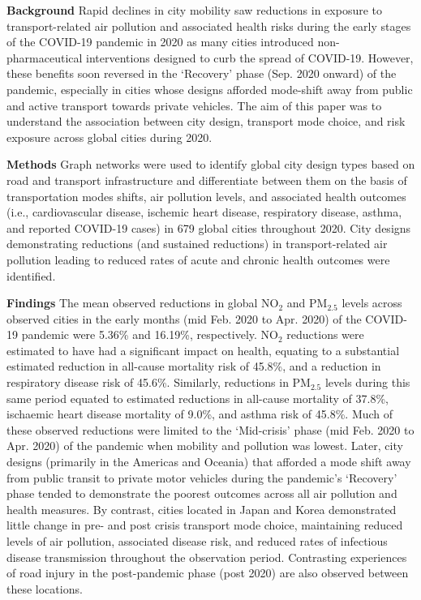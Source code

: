 \documentclass[preprint,10pt]{elsarticle} %
\newcommand{\absdiv}[1]{%
  \par\addvspace{.5\baselineskip}%
  \noindent\textbf{#1}\quad\ignorespaces}
\begin{document}


 \absdiv{\textcolor{OliveGreen}{Background}}
Rapid declines in city mobility saw reductions in exposure to transport-related air pollution and associated health risks during the early stages of the COVID-19 pandemic in 2020 as many cities introduced non-pharmaceutical interventions designed to curb the spread of COVID-19. However, these benefits soon reversed in the `Recovery' phase (Sep. 2020 onward) of the pandemic, especially in cities whose designs afforded mode-shift away from public and active transport towards private vehicles. The aim of this paper was to understand the association between city design, transport mode choice, and risk exposure across global cities during 2020.
 \absdiv{\textcolor{OliveGreen}{Methods}}
Graph networks were used to identify global city design types based on road and transport infrastructure and differentiate between them on the basis of transportation modes shifts, air pollution levels, and associated health outcomes (i.e., cardiovascular disease, ischemic heart disease, respiratory disease, asthma, and reported COVID-19 cases) in 679 global cities throughout 2020. City designs demonstrating reductions (and sustained reductions) in transport-related air pollution leading to reduced rates of acute and chronic health outcomes were identified.
 \absdiv{\textcolor{OliveGreen}{Findings}}
The mean observed reductions in global NO$_{2}$ and PM$_{2.5}$ levels across observed cities in the early months (mid Feb. 2020 to Apr. 2020) of the COVID-19 pandemic were 5.36\% and 16.19\%, respectively. NO$_{2}$ reductions were estimated to have had a significant impact on health, equating to a substantial estimated reduction in all-cause mortality risk of 45.8\%, and a reduction in respiratory disease risk of 45.6\%. Similarly, reductions in PM$_{2.5}$ levels during this same period equated to estimated reductions in all-cause mortality of 37.8\%, ischaemic heart disease mortality of 9.0\%, and asthma risk of 45.8\%. Much of these observed reductions were limited to the `Mid-crisis' phase (mid Feb. 2020 to Apr. 2020) of the pandemic when mobility and pollution was lowest. Later, city designs (primarily in the Americas and Oceania) that afforded a mode shift away from public transit to private motor vehicles during the pandemic's `Recovery' phase tended to demonstrate the poorest outcomes across all air pollution and health measures. By contrast, cities located in Japan and Korea demonstrated little change in pre- and post crisis transport mode choice, maintaining reduced levels of air pollution, associated disease risk, and reduced rates of infectious disease transmission throughout the observation period. Contrasting experiences of road injury in the post-pandemic phase (post 2020) are also observed between these locations. 
\end{document}

